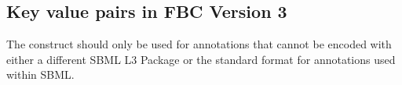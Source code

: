 
\newpage
\subsection{Key value pairs in FBC Version 3}
\label{best-practices-V3}
The \KeyValuePair construct should only be used for annotations that cannot be encoded with either a different SBML L3 Package or the standard format for annotations used within SBML.
